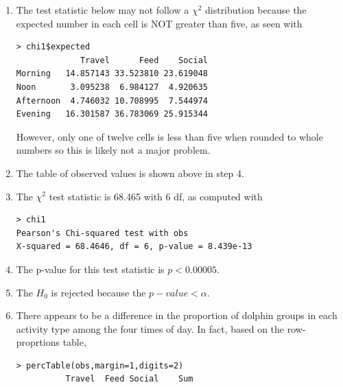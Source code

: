 \documentclass[10pt,openany]{book}\usepackage[]{graphicx}\usepackage[]{color}
\makeatletter
\newenvironment{kframe}{%
 \def\at@end@of@kframe{}%
 \ifinner\ifhmode%
  \def\at@end@of@kframe{\end{minipage}}%
  \begin{minipage}{\columnwidth}%
 \fi\fi%
 \def\FrameCommand##1{\hskip\@totalleftmargin \hskip-\fboxsep
 \colorbox{shadecolor}{##1}\hskip-\fboxsep
     \hskip-\linewidth \hskip-\@totalleftmargin \hskip\columnwidth}%
 \MakeFramed {\advance\hsize-\width
   \@totalleftmargin\z@ \linewidth\hsize
   \@setminipage}}%
 {\par\unskip\endMakeFramed%
 \at@end@of@kframe}
\newenvironment{knitrout}{}{} %
\makeatother
\begin{document}
\begin{itemize}
\begin{enumerate}
\begin{knitrout}
\begin{kframe}
{\ttfamily\noindent\color{warningcolor}{Warning in chisq.test(obs, correct = FALSE): Chi-squared approximation may be incorrect}}\end{kframe}
\end{knitrout}
      \item The test statistic below may not follow a $\chi^{2}$ distribution because the expected number in each cell is NOT greater than five, as seen with
\begin{knitrout}
\color{fgcolor}\begin{kframe}
\begin{verbatim}
> chi1$expected
             Travel      Feed    Social
Morning   14.857143 33.523810 23.619048
Noon       3.095238  6.984127  4.920635
Afternoon  4.746032 10.708995  7.544974
Evening   16.301587 36.783069 25.915344
\end{verbatim}
\end{kframe}
\end{knitrout}
However, only one of twelve cells is less than five when rounded to whole numbers so this is likely not a major problem.
      \item The table of observed values is shown above in step 4.
      \item The $\chi^{2}$ test statistic is 68.465 with 6 df, as computed with
\begin{knitrout}
\color{fgcolor}\begin{kframe}
\begin{verbatim}
> chi1
Pearson's Chi-squared test with obs 
X-squared = 68.4646, df = 6, p-value = 8.439e-13
\end{verbatim}
\end{kframe}
\end{knitrout}
      \item The p-value for this test statistic is $p<0.00005$.
      \item The $H_{0}$ is rejected because the $p-value <\alpha$.
      \item There appears to be a difference in the proportion of dolphin groups in each activity type among the four times of day.  In fact, based on the row-proprtions table,
\begin{knitrout}
\color{fgcolor}\begin{kframe}
\begin{verbatim}
> percTable(obs,margin=1,digits=2)
          Travel  Feed Social    Sum

\end{verbatim}
\end{kframe}
\end{knitrout}
\end{enumerate}
\end{itemize}
\end{document}
